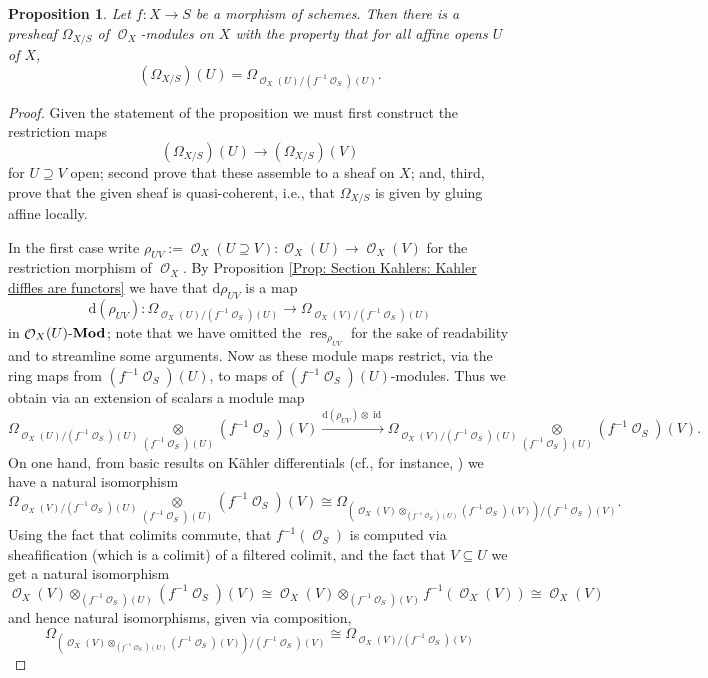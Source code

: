 \documentclass{amsart}
\newtheorem{proposition}[equation]{Proposition}
\theoremstyle{definition}
\DeclareMathOperator{\Ocal}{\mathcal{O}}
\DeclareMathOperator{\id}{id}
\DeclareMathOperator{\res}{res}
\newcommand{\Mod}[1]{{#1}\textnormal{-}\mathbf{Mod}}
\newcommand{\Kah}[2]{\Omega_{{#1}/{#2}}}
\numberwithin{equation}{subsection}
\begin{document}
\begin{proposition}\label{Prop: Section Kahlers: Presheaf of relative Kahlers}
Let $f:X \to S$ be a morphism of schemes. Then there is a presheaf $\Kah{X}{S}$ of $\Ocal_X$-modules on $X$ with the property that for all affine opens $U$ of $X$,
\[
\left(\Kah{X}{S}\right)(U) = \Kah{\Ocal_X(U)}{(f^{-1}\Ocal_S)(U)}.
\]
\end{proposition}
\begin{proof}
Given the statement of the proposition we must first construct the restriction maps
\[
\left(\Kah{X}{S}\right)(U) \to \left(\Kah{X}{S}\right)(V)
\]
for $U \supseteq V$ open; second prove that these assemble to a sheaf on $X$; and, third, prove that the given sheaf is quasi-coherent, i.e., that $\Omega_{X/S}$ is given by gluing affine locally.

In the first case write $\rho_{UV}:=\Ocal_X(U \supseteq V):\Ocal_X(U) \to \Ocal_X(V)$ for the restriction morphism of $\Ocal_X$. By Proposition \ref{Prop: Section Kahlers: Kahler diffles are functors} we have that $\mathrm{d}\rho_{UV}$ is a map
\[
\mathrm{d}\left(\rho_{UV}\right):\Kah{\Ocal_X(U)}{(f^{-1}\Ocal_S)(U)} \to \Kah{\Ocal_X(V)}{(f^{-1}\Ocal_S)(U)}
\]
in $\Mod{\Ocal_X(U)}$; note that we have omitted the $\res_{\rho_{UV}}$ for the sake of readability and to streamline some arguments. Now as these module maps restrict, via the ring maps from $(f^{-1}\Ocal_S)(U)$, to maps of $(f^{-1}\Ocal_S)(U)$-modules. Thus we obtain via an extension of scalars a module map
\[
\Kah{\Ocal_X(U)}{(f^{-1}\Ocal_S)(U)} \underset{{(f^{-1}\Ocal_S)(U)}}{\otimes} \left(f^{-1}\Ocal_S\right)(V) \xrightarrow{\mathrm{d}(\rho_{UV}) \otimes \id} \Kah{\Ocal_X(V)}{(f^{-1}\Ocal_S)(U)} \underset{(f^{-1}\Ocal_S)(U)}{\otimes} \left(f^{-1}\Ocal_S\right)(V).
\]
On one hand, from basic results on K{\"a}hler differentials (cf.\@, for instance, \cite[Proposition 16.4]{Eisenbud}) we have a natural isomorphism
\[
\Kah{\Ocal_X(V)}{(f^{-1}\Ocal_S)(U)} \underset{(f^{-1}\Ocal_S)(U)}{\otimes} \left(f^{-1}\Ocal_S\right)(V) \cong \Kah{(\Ocal_X(V) \otimes_{(f^{-1}\Ocal_S)(U)} \left(f^{-1}\Ocal_S\right)(V))}{(f^{-1}\Ocal_S)(V)}.
\]
Using the fact that colimits commute, that $f^{-1}(\Ocal_S)$ is computed via sheafification (which is a colimit) of a filtered colimit, and the fact that $V \subseteq U$ we get a natural isomorphism
\[
\Ocal_X(V) \otimes_{(f^{-1}\Ocal_S)(U)} \left(f^{-1}\Ocal_S\right)(V) \cong \Ocal_X(V) \otimes_{(f^{-1}\Ocal_S)(V)} f^{-1}\left(\Ocal_X(V)\right) \cong \Ocal_X(V)
\]
and hence natural isomorphisms, given via composition,
\[
\Kah{(\Ocal_X(V) \otimes_{(f^{-1}\Ocal_S)(U)} \left(f^{-1}\Ocal_S\right)(V))}{(f^{-1}\Ocal_S)(V)} \cong \Kah{\Ocal_X(V)}{(f^{-1}\Ocal_S)(V)}
\]
\end{proof}
\end{document}
